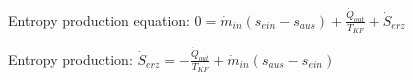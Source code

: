 Entropy production equation:  
\( 0 = \dot{m}_{in} (s_{ein} - s_{aus}) + \frac{\dot{Q}_{out}}{T_{KF}} + \dot{S}_{erz} \)  

Entropy production:  
\( \dot{S}_{erz} = -\frac{\dot{Q}_{out}}{T_{KF}} + \dot{m}_{in} (s_{aus} - s_{ein}) \)